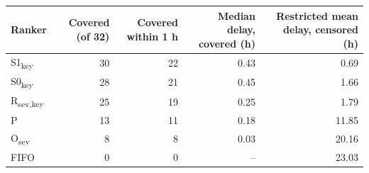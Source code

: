 \begin{tabular}{lrrrr}
\toprule
Ranker & Covered (of 32) & Covered within 1 h & Median delay, covered (h) & Restricted mean delay, censored (h) \\
\midrule
S1\textsubscript{key} & 30 & 22 & 0.43 & 0.69 \\
S0\textsubscript{key} & 28 & 21 & 0.45 & 1.66 \\
R\textsubscript{sev,key} & 25 & 19 & 0.25 & 1.79 \\
P & 13 & 11 & 0.18 & 11.85 \\
O\textsubscript{sev} & 8 & 8 & 0.03 & 20.16 \\
FIFO & 0 & 0 & -- & 23.03 \\
\bottomrule
\end{tabular}
